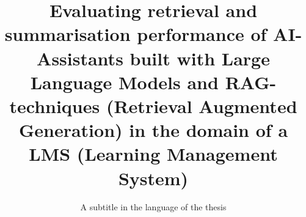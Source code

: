 ﻿\title{Evaluating retrieval and summarisation performance of AI-Assistants built with Large Language Models and RAG-techniques (Retrieval Augmented Generation) in the domain of a LMS (Learning Management System)}
\subtitle{A subtitle in the language of the thesis}










